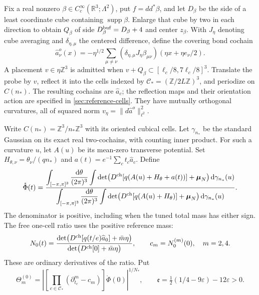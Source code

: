 \documentclass[11pt,letterpaper,reqno]{amsart}
\newcommand{\R}{\mathbb R}
\newcommand{\Z}{\mathbb Z}
\newcommand{\dd}{\mathrm d}
\DeclareMathOperator{\supp}{supp}
\begin{document}
Fix a real nonzero $\beta\in C_c^\infty(\R^3;\Lambda^2)$,
put $f=dd^*\beta$, and let $D_\beta$ be the side of a least
coordinate cube containing $\supp\beta$. Enlarge that cube by two
in each direction to obtain $Q_\beta$ of side
$D_\beta^{\rm buf}=D_\beta+4$ and center $z_\beta$.
With $J_\eta$ denoting cube averaging and $\delta_{\eta,\mu}$
the centered difference, define the covering bond cochain
\begin{equation}\label{eq:rrm-probe-definition}
 \widehat a^o_\nu(x)=
 -\eta^{1/2}\sum_{\mu\ne\nu}
 (\delta_{\eta,\mu}J_\eta\beta_{\mu\nu})
                         (\eta x+\eta e_\nu/2).
\end{equation}
A placement $v\in\eta\Z^3$ is admitted when
$v+Q_\beta\subset[\ell_c/8,7\ell_c/8]^3$.
Translate the probe by $v$, reflect it into the cells indexed by
$\mathcal C_*=(\Z/2L\Z)^3$, and periodize on $C(n_*)$.
The resulting cochains are $\widehat a_c$; the reflection maps
and their orientation action are specified in \cref{sec:reference-cells}.
They have mutually orthogonal curvatures, all of squared norm
$v_\eta=\|d\widehat a^o\|_{\ell^2}^2$.

Write $C(n_*)=\Z^3/n_*\Z^3$ with its oriented cubical cells.
Let $\gamma_{n_*}$ be the standard Gaussian on its exact real
two-cochains, with counting inner product. For such a
curvature $u$, let $A(u)$ be its mean-zero transverse potential.
Set $H_{\theta,\nu}=\theta_\nu/(qn_*)$ and
$a(t)=e^{-1}\sum_ct_c\widehat a_c$. Define
\begin{equation}\label{eq:rrm-normalized-response}
 \mathring\Phi(t)=
 \frac{\displaystyle\int_{[-\pi,\pi]^3}\frac{\dd\theta}{(2\pi)^3}
       \int\det\bigl(D^{\rm ch}[q(A(u)+H_\theta+a(t))]
                         +\boldsymbol\mu_N\bigr)\,\dd\gamma_{n_*}(u)}
      {\displaystyle\int_{[-\pi,\pi]^3}\frac{\dd\theta}{(2\pi)^3}
       \int\det\bigl(D^{\rm ch}[q(A(u)+H_\theta)]
                         +\boldsymbol\mu_N\bigr)\,\dd\gamma_{n_*}(u)}.
\end{equation}
The denominator is positive, including when the tuned total mass
has either sign. The free one-cell ratio uses the positive reference mass:
\begin{equation}\label{eq:response-free-ratio}
 N_0(t)=\frac{\det\bigl(D^{\rm ch}[q(t/e)\widehat a_0]
                                      +\bar m\eta\bigr)}
                   {\det\bigl(D^{\rm ch}[0]+\bar m\eta\bigr)},
 \qquad c_m=N_0^{(m)}(0),\quad m=2,4.
\end{equation}
These are ordinary derivatives of the ratio. Put
\[
 \Theta_m^{(0)}=
 \left|\left[\prod_{c\in\mathcal C_*}
           (\partial_{t_c}^m-c_m)\right]\mathring\Phi(0)
                                      \right|^{1/N_*},\qquad
 \mathfrak e=\tfrac12(1/4-9\varepsilon)-12\varepsilon>0.
\]
\end{document}
